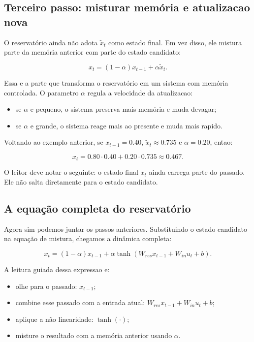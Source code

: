 \documentclass[12pt]{article}
\providecommand{\tightlist}{%
  \setlength{\itemsep}{0pt}\setlength{\parskip}{0pt}}
\begin{document}
\subsection{Terceiro passo: misturar memória e atualizacao nova}\label{36-terceiro-passo-misturar-memuxf3ria-e-atualizacao-nova}

O reservatório ainda não adota \(\widetilde{x}_t\) como estado final. Em vez disso, ele mistura parte da memória anterior com parte do estado candidato:

\[
x_t = (1 - \alpha) x_{t-1} + \alpha \widetilde{x}_t.
\]

Essa e a parte que transforma o reservatório em um sistema com memória controlada. O parametro \(\alpha\) regula a velocidade da atualizacao:

\begin{itemize}
\tightlist
\item
  se \(\alpha\) e pequeno, o sistema preserva mais memória e muda devagar;
\item
  se \(\alpha\) e grande, o sistema reage mais ao presente e muda mais rapido.
\end{itemize}

Voltando ao exemplo anterior, se \(x_{t-1} = 0.40\), \(\widetilde{x}_t \approx 0.735\) e \(\alpha = 0.20\), entao:

\[
x_t = 0.80 \cdot 0.40 + 0.20 \cdot 0.735 \approx 0.467.
\]

O leitor deve notar o seguinte: o estado final \(x_t\) ainda carrega parte do passado. Ele não salta diretamente para o estado candidato.

\subsection{A equação completa do reservatório}\label{37-a-equauxe7uxe3o-completa-do-reservatuxf3rio}

Agora sim podemos juntar os passos anteriores. Substituindo o estado candidato na equação de mistura, chegamos a dinâmica completa:

\[
x_t = (1 - \alpha) x_{t-1} + \alpha \tanh(W_{res} x_{t-1} + W_{in} u_t + b).
\]

A leitura guiada dessa expressao e:

\begin{itemize}
\tightlist
\item
  olhe para o passado: \(x_{t-1}\);
\item
  combine esse passado com a entrada atual: \(W_{res} x_{t-1} + W_{in} u_t + b\);
\item
  aplique a não linearidade: \(\tanh(\cdot)\);
\item
  misture o resultado com a memória anterior usando \(\alpha\).
\end{itemize}
\end{document}
